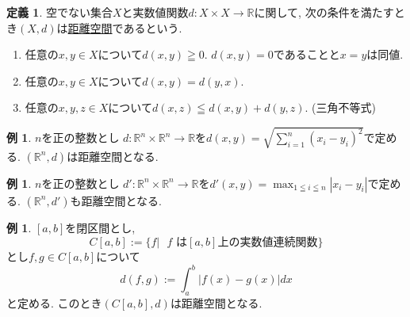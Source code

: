 \documentclass[dvipdfmx,a4paper,11pt]{article}
\newcommand{\R}{\mathbb{R}}
\theoremstyle{definition}
\newtheorem{dfn}[thm]{定義}
\newtheorem{exa}[thm]{例}
\begin{document}
\begin{tcolorbox}[
    colback = white,
    colframe = green!35!black,
    fonttitle = \bfseries,
    breakable = true]
    \begin{dfn}
    \text{}
    空でない集合$X$と実数値関数$d : X \times X \rightarrow \R$に関して, 次の条件を満たすとき$(X,d)$は\underline{距離空間}であるという.
    \begin{enumerate}
    \setlength{\parskip}{0cm} 
  \setlength{\itemsep}{0cm} 
    \item 任意の$x,y \in X$について$d(x,y) \geqq 0$. $d(x,y)=0$であることと$x=y$は同値. 
    \item 任意の$x,y \in X$について$d(x,y)=d(y,x)$.
    \item 任意の$x,y,z \in X$について$d(x,z) \leqq d(x,y) + d(y,z)$. (三角不等式)
    \end{enumerate}
  \end{dfn}
 \end{tcolorbox}
 
 \begin{exa}
 $n$を正の整数とし
$d : \R^n \times \R^n \rightarrow \R$を$d(x,y) = \sqrt{\sum_{i=1}^n (x_i - y_i)^2}$で定める. $(\R^n, d)$は距離空間となる. 
 \end{exa}
 \begin{exa}
 $n$を正の整数とし
$d' : \R^n \times \R^n \rightarrow \R$を$d'(x,y) = \max_{1\leqq i \leqq n}|x_i - y_i|$で定める. $(\R^n, d')$も距離空間となる. 
 \end{exa}
 \begin{exa}
$[a,b]$を閉区間とし, 
$$
C[a,b]:= \{f | \text{ $f$ は$[a,b]$上の実数値連続関数} \}
$$
とし$f,g \in C[a,b]$について
$$
d(f,g) := \int_{a}^{b}|f(x) - g(x)| dx
$$
と定める. このとき$(C[a,b],d)$は距離空間となる.
 \end{exa}
 
\end{document}
